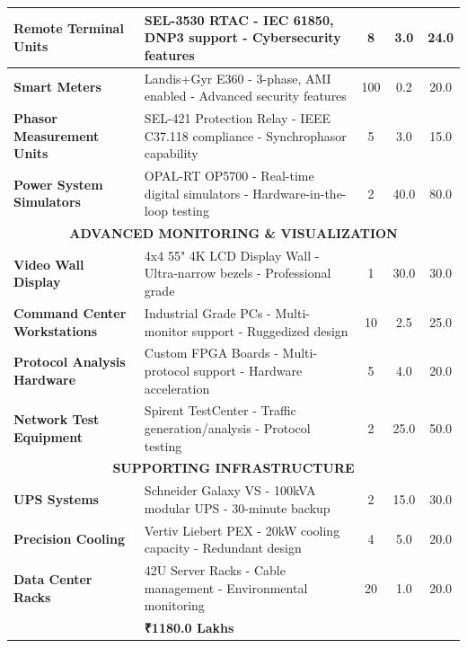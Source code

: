 \documentclass[12pt,a4paper]{article}
\begin{document}
\begin{longtable}{|p{4cm}|p{6cm}|c|c|c|}
\textbf{Remote Terminal Units} & 
SEL-3530 RTAC
- IEC 61850, DNP3 support
- Cybersecurity features & 8 & 3.0 & 24.0 \\
\hline

\textbf{Smart Meters} & 
Landis+Gyr E360
- 3-phase, AMI enabled
- Advanced security features & 100 & 0.2 & 20.0 \\
\hline

\textbf{Phasor Measurement Units} & 
SEL-421 Protection Relay
- IEEE C37.118 compliance
- Synchrophasor capability & 5 & 3.0 & 15.0 \\
\hline

\textbf{Power System Simulators} & 
OPAL-RT OP5700
- Real-time digital simulators
- Hardware-in-the-loop testing & 2 & 40.0 & 80.0 \\
\hline

\multicolumn{5}{|c|}{\cellcolor{gray}\textbf{ADVANCED MONITORING \& VISUALIZATION}} \\
\hline

\textbf{Video Wall Display} & 
4x4 55" 4K LCD Display Wall
- Ultra-narrow bezels
- Professional grade & 1 & 30.0 & 30.0 \\
\hline

\textbf{Command Center Workstations} & 
Industrial Grade PCs
- Multi-monitor support
- Ruggedized design & 10 & 2.5 & 25.0 \\
\hline

\textbf{Protocol Analysis Hardware} & 
Custom FPGA Boards
- Multi-protocol support
- Hardware acceleration & 5 & 4.0 & 20.0 \\
\hline

\textbf{Network Test Equipment} & 
Spirent TestCenter
- Traffic generation/analysis
- Protocol testing & 2 & 25.0 & 50.0 \\
\hline

\multicolumn{5}{|c|}{\cellcolor{gray}\textbf{SUPPORTING INFRASTRUCTURE}} \\
\hline

\textbf{UPS Systems} & 
Schneider Galaxy VS
- 100kVA modular UPS
- 30-minute backup & 2 & 15.0 & 30.0 \\
\hline

\textbf{Precision Cooling} & 
Vertiv Liebert PEX
- 20kW cooling capacity
- Redundant design & 4 & 5.0 & 20.0 \\
\hline

\textbf{Data Center Racks} & 
42U Server Racks
- Cable management
- Environmental monitoring & 20 & 1.0 & 20.0 \\
\hline

\rowcolor{yellow}
\multicolumn{4}{|c|}{\textbf{TOTAL CAPITAL EQUIPMENT}} & \textbf{₹1180.0 Lakhs} \\
\hline

\end{longtable}
\end{document}
